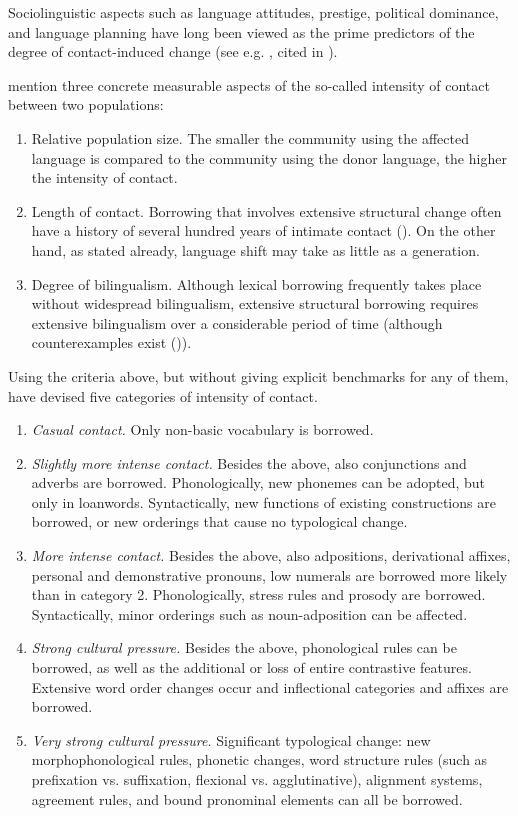 Sociolinguistic aspects such as language attitudes, prestige, political dominance, and language planning have long been viewed as the prime predictors of the degree of contact-induced change (see e.g. \cite{kiparsky1938comment,coteanu1957contact}, cited in \cite{thomasonkaufman1988}).

\textcite[66]{thomasonkaufman1988} mention three concrete measurable aspects of the so-called intensity of contact between two populations:

\begin{enumerate}
	\item Relative population size. The smaller the community using the affected language is compared to the community using the donor language, the higher the intensity of contact.
	\item Length of contact. Borrowing that involves extensive structural change often have a history of several hundred years of intimate contact (\cite[41]{thomasonkaufman1988}). On the other hand, as stated already, language shift may take as little as a generation.
	\item Degree of bilingualism. Although lexical borrowing frequently takes place without widespread bilingualism, extensive structural borrowing requires extensive bilingualism over a considerable period of time (although counterexamples exist (\cite[346]{thomasonkaufman1988})). 
\end{enumerate}

Using the criteria above, but without giving explicit benchmarks for any of them, \textcite{thomasonkaufman1988} have devised five categories of intensity of contact.

\pagebreak

\begin{enumerate}
	\item \emph{Casual contact.} Only non-basic vocabulary is borrowed.
	\item \emph{Slightly more intense contact.} Besides the above, also conjunctions and adverbs are borrowed. Phonologically, new phonemes can be adopted, but only in loanwords. Syntactically, new functions of existing constructions are borrowed, or new orderings that cause no typological change.
	\item \emph{More intense contact.} Besides the above, also adpositions, derivational affixes, personal and demonstrative pronouns, low numerals are borrowed more likely than in category 2. Phonologically, stress rules and prosody are borrowed. Syntactically, minor orderings such as noun-adposition can be affected.
	\item \emph{Strong cultural pressure.} Besides the above, phonological rules can be borrowed, as well as the additional or loss of entire contrastive features. Extensive word order changes occur and inflectional categories and affixes are borrowed.
	\item \emph{Very strong cultural pressure.} Significant typological change: new morphophonological rules, phonetic changes, word structure rules (such as prefixation vs. suffixation, flexional vs. agglutinative), alignment systems, agreement rules, and bound pronominal elements can all be borrowed.
\end{enumerate}


